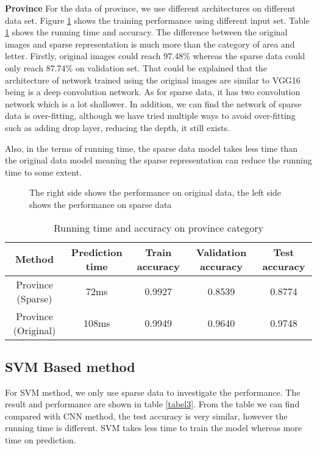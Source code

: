 \textbf{Province} 
For the data of province, we use different architectures on different data set. 
Figure \ref{provicne} shows the training performance using different input set. 
Table \ref{label2} shows the running time and accuracy. 
The difference between the original images and sparse representation is 
much more than the category of area and letter. 
Firstly, original images could reach 97.48\% whereas the sparse data could 
only reach 87.74\% on validation set. 
That could be explained that the architecture of network trained using the 
original images are similar to VGG16 being is a deep convolution network.
As for sparse data, it has two convolution network which is a lot shallower. 
In addition, we can find the network of sparse data is over-fitting, 
although we have tried multiple ways to avoid over-fitting 
such as adding drop layer, reducing the depth, it still exists. 

Also, in the terms of running time, the sparse data model takes less time 
than the original data model meaning the sparse representation can 
reduce the running time to some extent. 

\begin{figure}[ht]
\centering
{}
\qquad
{}
\qquad
{}
\qquad
{}
\qquad
\caption{The right side shows the performance on original data, the left side shows the performance on sparse data}
\label{provicne}
\end{figure}

\begin{table}[ht]
\centering
\scalebox{0.70} {
    \begin{tabular}{|c|c|c|c|c|}
        \hline
        Method&Prediction time&Train accuracy&Validation accuracy&Test accuracy\\
        \hline
        Province (Sparse)&72ms&0.9927&0.8539&0.8774\\
        \hline
        Province (Original)&108ms&0.9949&0.9640&0.9748\\
        \hline
    \end{tabular}
}
\caption{Running time and accuracy on province category}
\label{label2}
\end{table}

\subsection{SVM Based method}
For SVM method, we only use sparse data to investigate the performance. 
The result and performance are shown in table \ref{tabel3}. 
From the table we can find compared with CNN method, the test accuracy 
is very similar, however the running time is different. 
SVM takes less time to train the model whereas more time on prediction.

